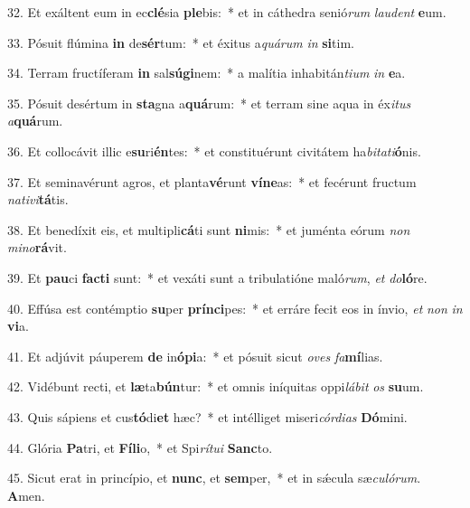 32. Et exáltent eum in ec\textbf{clé}sia \textbf{ple}bis:~*  et in cáthedra senió\textit{rum} \textit{lau}\textit{dent} \textbf{e}um.\

33. Pósuit flúmina \textbf{in} de\textbf{sér}tum:~*  et éxitus a\textit{quá}\textit{rum} \textit{in} \textbf{si}tim.\

34. Terram fructíferam \textbf{in} sal\textbf{sú}\textbf{gi}nem:~*  a malítia inhabitán\textit{ti}\textit{um} \textit{in} \textbf{e}a.\

35. Pósuit desértum in \textbf{sta}gna a\textbf{quá}rum:~*  et terram sine aqua in éx\textit{i}\textit{tus} \textit{a}\textbf{quá}rum.\

36. Et collocávit illic e\textbf{su}ri\textbf{én}tes:~*  et constituérunt civitátem ha\textit{bi}\textit{ta}\textit{ti}\textbf{ó}nis.\

37. Et seminavérunt agros, et planta\textbf{vé}runt \textbf{ví}\textbf{ne}as:~*  et fecérunt fructum \textit{na}\textit{ti}\textit{vi}\textbf{tá}tis.\

38. Et benedíxit eis, et multipli\textbf{cá}ti sunt \textbf{ni}mis:~*  et juménta eórum \textit{non} \textit{mi}\textit{no}\textbf{rá}vit.\

39. Et \textbf{pau}ci \textbf{fac}\textbf{ti} sunt:~*  et vexáti sunt a tribulatióne maló\textit{rum}, \textit{et} \textit{do}\textbf{ló}re.\

40. Effúsa est contémptio \textbf{su}per \textbf{prín}\textbf{ci}pes:~*  et erráre fecit eos in ínvio, \textit{et} \textit{non} \textit{in} \textbf{vi}a.\

41. Et adjúvit páuperem \textbf{de} in\textbf{ó}\textbf{pi}a:~*  et pósuit sicut \textit{o}\textit{ves} \textit{fa}\textbf{mí}lias.\

42. Vidébunt recti, et \textbf{læ}ta\textbf{bún}tur:~*  et omnis iníquitas oppi\textit{lá}\textit{bit} \textit{os} \textbf{su}um.\

43. Quis sápiens et cus\textbf{tó}di\textbf{et} hæc?~*  et intélliget miseri\textit{cór}\textit{di}\textit{as} \textbf{Dó}mini.\

44. Glória \textbf{Pa}tri, et \textbf{Fí}\textbf{li}o,~*  et Spi\textit{rí}\textit{tu}\textit{i} \textbf{Sanc}to.\

45. Sicut erat in princípio, et \textbf{nunc}, et \textbf{sem}per,~*  et in sǽcula sæ\textit{cu}\textit{ló}\textit{rum}. \textbf{A}men.\

